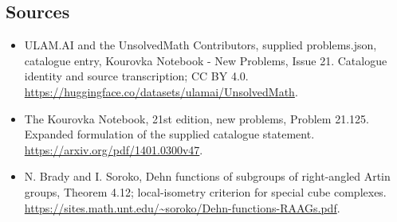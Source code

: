 \documentclass[11pt,a4paper]{article}
\begin{document}
\subsection{Sources}
\begin{itemize}
\item[S1] ULAM.AI and the UnsolvedMath Contributors, supplied problems.json, catalogue entry, Kourovka Notebook - New Problems, Issue 21. Catalogue identity and source transcription; CC BY 4.0.
\url{https://huggingface.co/datasets/ulamai/UnsolvedMath}.
\item[S2] The Kourovka Notebook, 21st edition, new problems, Problem 21.125. Expanded formulation of the supplied catalogue statement.
\url{https://arxiv.org/pdf/1401.0300v47}.
\item[S3] N. Brady and I. Soroko, Dehn functions of subgroups of right-angled Artin groups, Theorem 4.12; local-isometry criterion for special cube complexes.
\url{https://sites.math.unt.edu/~soroko/Dehn-functions-RAAGs.pdf}.
\end{itemize}
\end{document}
